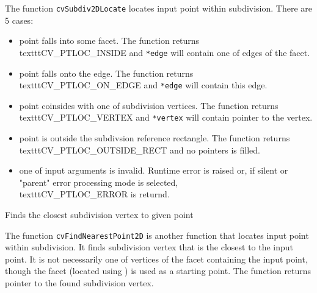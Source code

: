 \begin{description}
\end{description}

The function \texttt{cvSubdiv2DLocate} locates input point within subdivision. There are 5 cases:

\begin{itemize}
 \item point falls into some facet. The function returns \\texttt{CV\_PTLOC\_INSIDE} and \texttt{*edge} will contain one of edges of the facet.
 \item point falls onto the edge. The function returns \\texttt{CV\_PTLOC\_ON\_EDGE} and \texttt{*edge} will contain this edge.
 \item point coinsides with one of subdivision vertices. The function returns \\texttt{CV\_PTLOC\_VERTEX} and \texttt{*vertex} will contain pointer to the vertex.
 \item point is outside the subdivsion reference rectangle. The function returns \\texttt{CV\_PTLOC\_OUTSIDE\_RECT} and no pointers is filled.
 \item one of input arguments is invalid. Runtime error is raised or, if silent or "parent" error processing mode is selected, \\texttt{CV\_PTLOC\_ERROR} is returnd.
\end{itemize}

\label{FindNearestPoint2D}

Finds the closest subdivision vertex to given point


\begin{description}
\end{description}

The function \texttt{cvFindNearestPoint2D} is another function that
locates input point within subdivision. It finds subdivision vertex that
is the closest to the input point. It is not necessarily one of vertices
of the facet containing the input point, though the facet (located using
) is used as a starting
point. The function returns pointer to the found subdivision vertex.

